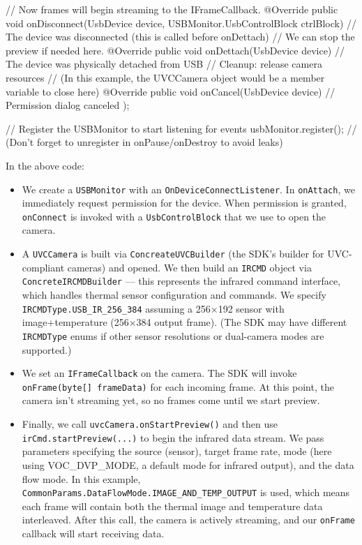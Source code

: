 {{{            // Now frames will begin streaming to the IFrameCallback.
        }
        @Override 
        public void onDisconnect(UsbDevice device, USBMonitor.UsbControlBlock ctrlBlock) {
            // The device was disconnected (this is called before onDettach)
            // We can stop the preview if needed here.
        }
        @Override 
        public void onDettach(UsbDevice device) {
            // The device was physically detached from USB
            // Cleanup: release camera resources
            // (In this example, the UVCCamera object would be a member variable to close here)
        }
        @Override 
        public void onCancel(UsbDevice device) {
            // Permission dialog canceled
        }
    });

    // Register the USBMonitor to start listening for events
    usbMonitor.register();
    // (Don’t forget to unregister in onPause/onDestroy to avoid leaks)

In the above code:

\begin{itemize}
\item We create a \texttt{USBMonitor} with an \texttt{OnDeviceConnectListener}. In
  \texttt{onAttach}, we immediately request permission for the device. When
  permission is granted, \texttt{onConnect} is invoked with a \texttt{UsbControlBlock}
  that we use to open the camera.
\item A \texttt{UVCCamera} is built via \texttt{ConcreateUVCBuilder} (the SDK's builder
  for UVC-compliant cameras) and opened. We then build an \texttt{IRCMD} object
  via \texttt{ConcreteIRCMDBuilder} --- this represents the infrared command
  interface, which handles thermal sensor configuration and commands. We
  specify \texttt{IRCMDType.USB_IR_256_384} assuming a 256×192 sensor with
  image+temperature (256×384 output
  frame)\cite{ref17}\cite{ref18}.
  (The SDK may have different \texttt{IRCMDType} enums if other sensor
  resolutions or dual-camera modes are supported.)
\item We set an \texttt{IFrameCallback} on the camera. The SDK will invoke
  \texttt{onFrame(byte[] frameData)} for each incoming frame. At this point,
  the camera isn't streaming yet, so no frames come until we start
  preview.
\item Finally, we call \texttt{uvcCamera.onStartPreview()} and then use
  \texttt{irCmd.startPreview(...)} to begin the infrared data
  stream\cite{ref19}\cite{ref20}.
  We pass parameters specifying the source (sensor), target frame rate,
  mode (here using VOC_DVP_MODE, a default mode for infrared output),
  and the data flow mode. In this example,
  \texttt{CommonParams.DataFlowMode.IMAGE_AND_TEMP_OUTPUT} is used, which means
  each frame will contain both the thermal image and temperature data
  interleaved\cite{ref21}.
  After this call, the camera is actively streaming, and our \texttt{onFrame}
  callback will start receiving data.


\end{itemize}}
